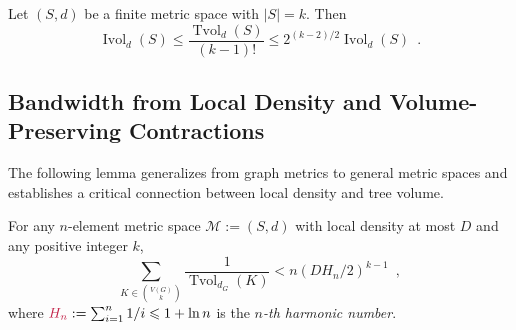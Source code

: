 \documentclass{patmorin}
\makeatletter
\renewcommand{\le}{\leqslant}
\newcommand{\defin}[1]{\emph{\textcolor{brightmaroon}{#1}}}
\def\mathcolor#1#{\@mathcolor{#1}}
\def\@mathcolor#1#2#3{%
  \protect\leavevmode
  \begingroup
    \color#1{#2}#3%
  \endgroup
}
\newcommand{\mathdefin}[1]{\mathcolor{brightmaroon}{#1}}
\DeclareMathOperator{\ivol}{Ivol}
\DeclareMathOperator{\tvol}{Tvol}
\makeatother
\begin{document}
\begin{lem}
  Let $(S,d)$ be a finite metric space with $|S|=k$.  Then
  \[
    \ivol_{d}(S) \le \frac{\tvol_d(S)}{(k-1)!} \le 2^{(k-2)/2}\ivol_d(S) \enspace .
  \]
\end{lem}

\subsection{Bandwidth from Local Density and Volume-Preserving Contractions}

The following lemma generalizes \citet[Theorem~10]{feige:approximating} from graph metrics to general metric spaces and establishes a critical connection between local density and tree volume.

\begin{lem}\label{reciprocal_sum}
  For any $n$-element metric space $\mathcal{M}:=(S,d)$ with local density at most $D$ and any positive integer $k$,
  \[
    \sum_{K\in \binom{V(G)}{k}}\frac{1}{\tvol_{d_G}(K)} < n(DH_n/2)^{k-1} \enspace ,
  \]
  where $\mathdefin{H_n}:=\sum_{i=1}^n 1/i\le 1+\ln n$ is the \defin{$n$-th harmonic number}.
\end{lem}
\end{document}

